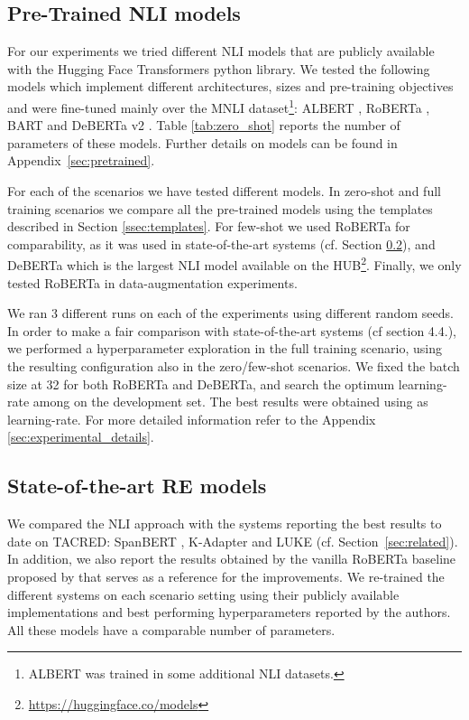 \documentclass[11pt]{article}
\begin{document}
\subsection{Pre-Trained NLI models}
\label{ssec:nli_models}

For our experiments we tried different NLI models that are publicly available with the Hugging Face  Transformers \cite{wolf-etal-2020-transformers} python library. We tested the following models which implement different architectures, sizes and pre-training objectives and were fine-tuned mainly over the MNLI \cite{williams-etal-2018-broad} dataset\footnote{ALBERT was trained in some additional NLI datasets.}: ALBERT \cite{Lan2020ALBERT:}, RoBERTa \cite{roberta}, 
BART \cite{lewis-etal-2020-bart} and DeBERTa v2 \cite{deberta}. Table \ref{tab:zero_shot} reports the number of parameters of these models. Further details on models can be found in Appendix~\ref{sec:pretrained}.

For each of the scenarios we have tested different models. In zero-shot and full training scenarios we compare all the pre-trained models using the templates described in Section \ref{ssec:templates}. For few-shot we used RoBERTa for comparability, as it was used in state-of-the-art systems (cf. Section \ref{ssec:RE_models}), and DeBERTa which is the largest NLI model available on the HUB\footnote{\url{https://huggingface.co/models}}. Finally, we only tested RoBERTa in data-augmentation experiments.


We ran 3 different runs on each of the experiments using different random seeds. In order to make a fair comparison with state-of-the-art systems (cf section 4.4.), we performed a hyperparameter exploration in the full training scenario, using the resulting configuration also in the zero/few-shot scenarios.
We fixed the batch size at 32 for both RoBERTa and DeBERTa, and search the optimum learning-rate among  on the development set. The best results were obtained using  as learning-rate. For more detailed information refer to the Appendix \ref{sec:experimental_details}.




\subsection{State-of-the-art RE models}
\label{ssec:RE_models}

We compared the NLI approach with the systems reporting the best results to date on TACRED:  SpanBERT \cite{joshi-etal-2020-spanbert},  K-Adapter \cite{wang2020kadapter} and LUKE \cite{yamada-etal-2020-luke} (cf. Section~\ref{sec:related}). In addition, we also report the results obtained by the vanilla RoBERTa baseline proposed by \citet{wang2020kadapter} that serves as a reference for the improvements.  We re-trained the different systems on each scenario setting using their publicly available implementations and best performing hyperparameters reported by the authors. All these models have a comparable number of parameters. 
\end{document}
